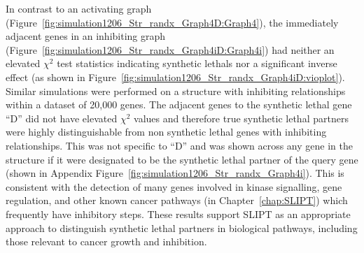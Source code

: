 In contrast to an activating graph (Figure~\ref{fig:simulation1206_Str_randx_Graph4D:Graph4}), the immediately adjacent genes  in an inhibiting graph (Figure~\ref{fig:simulation1206_Str_randx_Graph4iD:Graph4i}) had neither an elevated $\chi^2$ test statistics indicating \glspl{synthetic lethal} nor a significant inverse effect (as shown in Figure~\ref{fig:simulation1206_Str_randx_Graph4iD:vioplot}). Similar simulations were performed on a  structure with inhibiting relationships within a dataset of 20,000 genes. The adjacent genes to the \gls{synthetic lethal} gene ``D'' did not have elevated $\chi^2$ values and therefore true \gls{synthetic lethal} partners were highly distinguishable from non synthetic lethal genes with inhibiting relationships. This was not specific to ``D'' and was shown across any gene in the  structure if it were designated to be the \gls{synthetic lethal} partner of the query gene (shown in Appendix Figure~\ref{fig:simulation1206_Str_randx_Graph4i}). This is consistent with the detection of many genes involved in kinase signalling, gene regulation, and other known cancer pathways (in Chapter~\ref{chap:SLIPT}) which frequently have inhibitory steps. These results support \gls{SLIPT} as an appropriate approach to distinguish \gls{synthetic lethal} partners in biological pathways, including those relevant to cancer growth and inhibition.


\iffalse
\begin{figure*}[!ht]
     \begin{center}
       \subcaptionbox{Graph Structure}{%
           \raisebox{0.15\textwidth}{
           \label{fig:simulation1206_Str_randx_Graph4iD:Graph4i}
           \texttt{[image: \{"/home/tomkelly/Documents/PhD Otago Uni/SL\_Model/Graph4iD".pdf]}}
           }
        }%
       \subcaptionbox{$\chi^2$ distribution for each gene}{%
           \label{fig:simulation1206_Str_randx_Graph4iD:vioplot}
           \texttt{[image: \{"/home/tomkelly/Documents/PhD Otago Uni/SL\_Model//RUN\_20161206\_Str\_randx/SL\_Model\_Test\_Graph\_1K\_Graph4i\_ROC\_samples\_SLstry\_vioplot(4)".pdf]}}
        }%
       \end{center}
      \caption[Detection of Synthetic Lethality within an Inhibiting Graph Structure]{\small \textbf{Detection of Synthetic Lethality within an Inhibiting  Graph Structure.} The gene ``D'' was designated to be \gls{synthetic lethal} and the $\chi^2$ value from \gls{SLIPT} was computed for each gene across the \glslink{graph}{graph} structure. The $\chi^2$ values were computed in 100 simulations of datasets of 20,000 genes including the \glslink{graph}{graph} structure and 1000 samples.}
\end{figure*}
\fi

